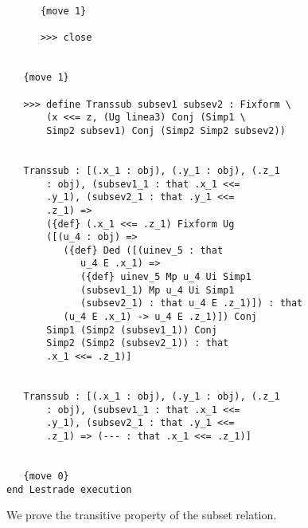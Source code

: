 \documentclass[12pt]{article}
\begin{document}
\begin{verbatim}
      {move 1}

      >>> close


   {move 1}

   >>> define Transsub subsev1 subsev2 : Fixform \
       (x <<= z, (Ug linea3) Conj (Simp1 \
       Simp2 subsev1) Conj (Simp2 Simp2 subsev2))


   Transsub : [(.x_1 : obj), (.y_1 : obj), (.z_1 
       : obj), (subsev1_1 : that .x_1 <<= 
       .y_1), (subsev2_1 : that .y_1 <<= 
       .z_1) => 
       ({def} (.x_1 <<= .z_1) Fixform Ug 
       ([(u_4 : obj) => 
          ({def} Ded ([(uinev_5 : that 
             u_4 E .x_1) => 
             ({def} uinev_5 Mp u_4 Ui Simp1 
             (subsev1_1) Mp u_4 Ui Simp1 
             (subsev2_1) : that u_4 E .z_1)]) : that 
          (u_4 E .x_1) -> u_4 E .z_1)]) Conj 
       Simp1 (Simp2 (subsev1_1)) Conj 
       Simp2 (Simp2 (subsev2_1)) : that 
       .x_1 <<= .z_1)]


   Transsub : [(.x_1 : obj), (.y_1 : obj), (.z_1 
       : obj), (subsev1_1 : that .x_1 <<= 
       .y_1), (subsev2_1 : that .y_1 <<= 
       .z_1) => (--- : that .x_1 <<= .z_1)]


   {move 0}
end Lestrade execution
\end{verbatim}

We prove the transitive property of the subset relation.
\end{document}
